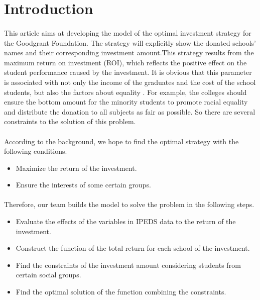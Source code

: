 \documentclass{mcmthesis}
\begin{document}
\maketitle

\tableofcontents

\newpage

\section{Introduction}
\paragraph{} This article aims at developing the model of the optimal investment strategy for the Goodgrant Foundation. The strategy will explicitly show the donated schools' names and their corresponding investment amount.This strategy results from the maximum return on investment (ROI), which reflects the positive effect on the student performance caused by the investment. It is obvious that this parameter is associated with not only the income of the graduates and the cost of the school students, but also the factors about equality . For example, the colleges should ensure the bottom amount for the minority students to promote racial equality and distribute the donation to all subjects as fair as possible. So there are several constraints to the solution of this problem.
\paragraph{} According to the background, we hope to find the optimal strategy with the following conditions.
\begin{itemize}
\item Maximize the return of the investment.
\item Ensure the interests of some certain groups.
\end{itemize}
\paragraph{} Therefore, our team builds the model to solve the problem in the following steps.

\begin{itemize}
\item Evaluate the effects of the variables in IPEDS data to the return of the investment.
\item Construct the function of the total return for each school of the investment.
\item Find the constraints of the investment amount considering students from certain social groups.
\item Find the optimal solution of the function combining the  constraints.
\end{itemize}
\end{document}
